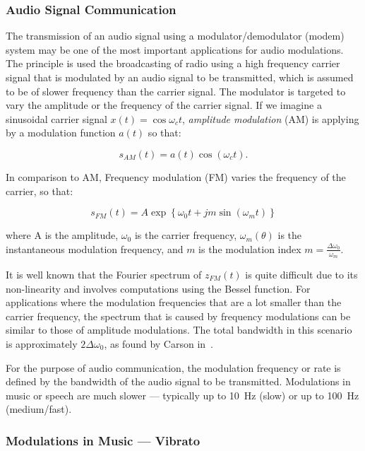 \subsubsection*{Audio Signal Communication}

The transmission of an audio signal using a modulator/demodulator (modem) system may be one of the most important applications for audio modulations. 
The principle is used the broadcasting of radio using a high frequency carrier signal that is modulated by an audio signal to be transmitted, which is assumed to be of slower frequency than the carrier signal.
The modulator is targeted to vary the amplitude or the frequency of the carrier signal.
If we imagine a sinusoidal carrier signal $x(t) = \cos \omega_c t$, \emph{amplitude modulation} (AM) is applying by a modulation function $a(t)$ so that:

\begin{equation*}
    s_{AM}(t) = a(t) \cos \left( \omega_{c} t\right).    
\end{equation*}

In comparison to AM, Frequency modulation (FM) varies the frequency of the carrier, so that:

\begin{equation*}
    s_{FM}(t) = A \exp \left\{ \omega_ { 0 } t + j m \sin \left( \omega_ { m } t \right) \right\}
\end{equation*}

where A is the amplitude, $\omega_0$ is the carrier frequency, $\omega_m(\theta)$ is the instantaneous modulation frequency, and $m$ is the modulation index $m = \frac{\Delta \omega_0} { \omega_{m} }$.

It is well known that the Fourier spectrum of $z_{FM}(t)$ is quite difficult due to its non-linearity and involves computations using the Bessel function.
For applications where the modulation frequencies that are a lot smaller than the carrier frequency, the spectrum that is caused by frequency modulations can be similar to those of amplitude modulations.
The total bandwidth in this scenario is approximately $2\Delta \omega_0$, as found by Carson in~\cite{carson22}.\par
For the purpose of audio communication, the modulation frequency or rate is defined by the bandwidth of the audio signal to be transmitted.
Modulations in music or speech are much slower --- typically up to 10~\si{\hertz} (slow) or up to 100~\si{\hertz} (medium/fast).

\subsubsection*{Modulations in Music --- Vibrato}

